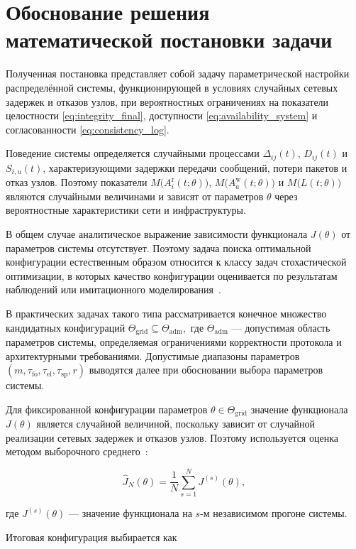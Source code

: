 \section{Обоснование решения математической постановки задачи}

Полученная постановка представляет собой задачу параметрической
настройки распределённой системы, функционирующей в условиях случайных
сетевых задержек и отказов узлов, при вероятностных ограничениях на
показатели целостности \eqref{eq:integrity_final},
доступности \eqref{eq:availability_system}
и согласованности \eqref{eq:consistency_log}.

Поведение системы определяется случайными процессами
$\Delta_{ij}(t)$, $D_{ij}(t)$ и $S_{i,u}(t)$,
характеризующими задержки передачи сообщений,
потери пакетов и отказ узлов.
Поэтому показатели
$M\big(A_i^{\mathrm{r}}(t;\theta)\big)$,
$M\big(A_a^{\mathrm{w}}(t;\theta)\big)$
и
$M\big(L(t;\theta)\big)$
являются случайными величинами и зависят от параметров $\theta$
через вероятностные характеристики сети и инфраструктуры.

В общем случае аналитическое выражение зависимости функционала
$J(\theta)$ от параметров системы отсутствует.
Поэтому задача поиска оптимальной конфигурации
естественным образом относится к классу задач
стохастической оптимизации,
в которых качество конфигурации оценивается
по результатам наблюдений или имитационного моделирования~\cite{Shapiro2009}.

В практических задачах такого типа рассматривается конечное множество
кандидатных конфигураций
$
\Theta_{\mathrm{grid}} \subseteq \Theta_{\mathrm{adm}},
$
где $\Theta_{\mathrm{adm}}$ --- допустимая область параметров системы,
определяемая ограничениями корректности протокола
и архитектурными требованиями.
Допустимые диапазоны параметров
$(m,\tau_{\mathrm{fo}},\tau_{\mathrm{el}},\tau_{\mathrm{sp}},r)$
выводятся далее при обосновании выбора параметров системы.

Для фиксированной конфигурации параметров
$\theta \in \Theta_{\mathrm{grid}}$
значение функционала $J(\theta)$ является случайной величиной,
поскольку зависит от случайной реализации сетевых задержек
и отказов узлов.
Поэтому используется оценка методом выборочного среднего~\cite{Kim2011}:

\[
\widehat{J}_N(\theta)
=
\frac{1}{N}
\sum_{s=1}^{N}
J^{(s)}(\theta),
\]

где $J^{(s)}(\theta)$ --- значение функционала
на $s$-м независимом прогоне системы.

Итоговая конфигурация выбирается как

